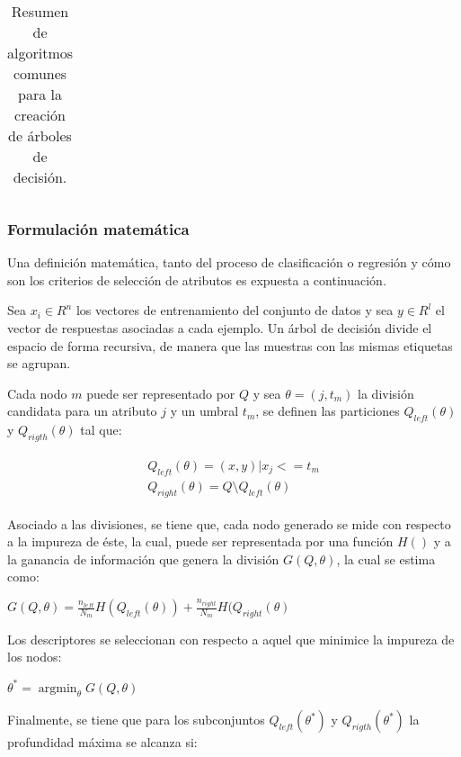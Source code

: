 \begin{longtable}[c]{|l|l|}
	\caption{Resumen de algoritmos comunes para la creación de árboles de decisión. }
	\label{tab:summary-alg-trees}\\
\end{longtable}

\subsubsection{Formulación matemática}

Una definición matemática, tanto del proceso de clasificación o regresión y cómo son los criterios de selección de atributos es expuesta a continuación.

Sea $x_{i} \in R^{n}$ los vectores de entrenamiento del conjunto de datos y sea $y \in R^l$ el vector de respuestas asociadas a cada ejemplo. Un árbol de decisión divide el espacio de forma recursiva, de manera que las muestras con las mismas etiquetas se agrupan.

Cada nodo $m$ puede ser representado por $Q$ y sea $\theta = (j, t_{m})$ la división candidata para un atributo $j$ y un umbral $t_{m}$, se definen las particiones $Q_{left}(\theta)$ y $Q_{rigth}(\theta)$ tal que:

\begin{align}
	\begin{aligned}
		Q_{left}(\theta) = {(x, y) | x_j <= t_m}\\Q_{right}(\theta) = Q \setminus Q_{left}(\theta)
	\end{aligned}
\end{align}
 

Asociado a las divisiones, se tiene que, cada nodo generado se mide con respecto a la impureza de éste, la cual, puede ser representada por una función $H()$ y a la ganancia de información que genera la división $G(Q, \theta)$, la cual se estima como:

\begin{center}
	$G(Q, \theta) = \frac{n_{left}}{N_m} H(Q_{left}(\theta))
+ \frac{n_{right}}{N_m} H(Q_{right}(\theta)$
\end{center}

Los descriptores se seleccionan con respecto a aquel que minimice la impureza de los nodos:

\begin{center}
	$\theta^* = \operatorname{argmin}_\theta  G(Q, \theta)$
\end{center}

Finalmente, se tiene que para los subconjuntos $Q_{left}(\theta^*)$ y $Q_{rigth}(\theta^*)$ la profundidad máxima se alcanza si:

